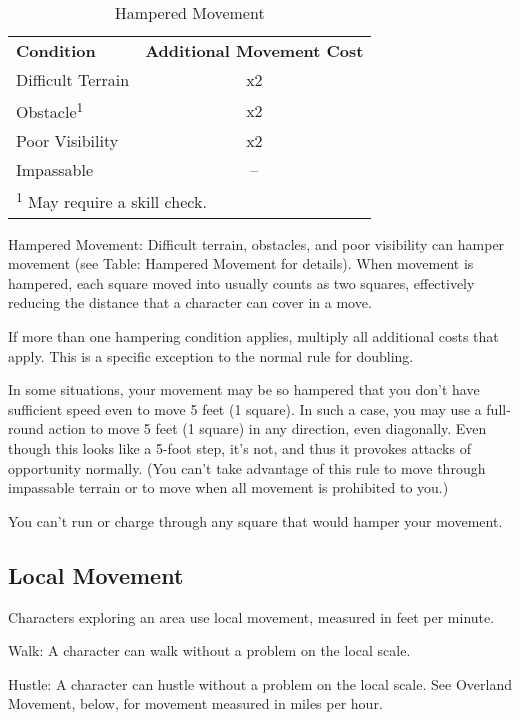 \begin{table}[htb]
\sffamily
{}
\caption{Hampered Movement}
\centering
\begin{tabular}{l c}
\textbf{Condition} & \textbf{Additional Movement Cost}\\
Difficult Terrain & x2\\
Obstacle\textsuperscript{1} & x2\\
Poor Visibility & x2\\
Impassable & --\\
\multicolumn{2}{l}{\textsuperscript{1} May require a skill check.}\\
\end{tabular}
\end{table}



				
Hampered Movement: Difficult terrain, obstacles, and poor visibility can hamper movement (see Table: Hampered Movement for details). When movement is hampered, each square moved into usually counts as two squares, effectively reducing the distance that a character can cover in a move. 
				
If more than one hampering condition applies, multiply all additional costs that apply. This is a specific exception to the normal rule for doubling. 
				
In some situations, your movement may be so hampered that you don't have sufficient speed even to move 5 feet (1 square). In such a case, you may use a full-round action to move 5 feet (1 square) in any direction, even diagonally. Even though this looks like a 5-foot step, it's not, and thus it provokes attacks of opportunity normally. (You can't take advantage of this rule to move through impassable terrain or to move when all movement is prohibited to you.)
				
You can't run or charge through any square that would hamper your movement.
				
\subsection{Local Movement}

				
Characters exploring an area use local movement, measured in feet per minute.
				
Walk: A character can walk without a problem on the local scale.
				
Hustle: A character can hustle without a problem on the local scale. See Overland Movement, below, for movement measured in miles per hour.
				
